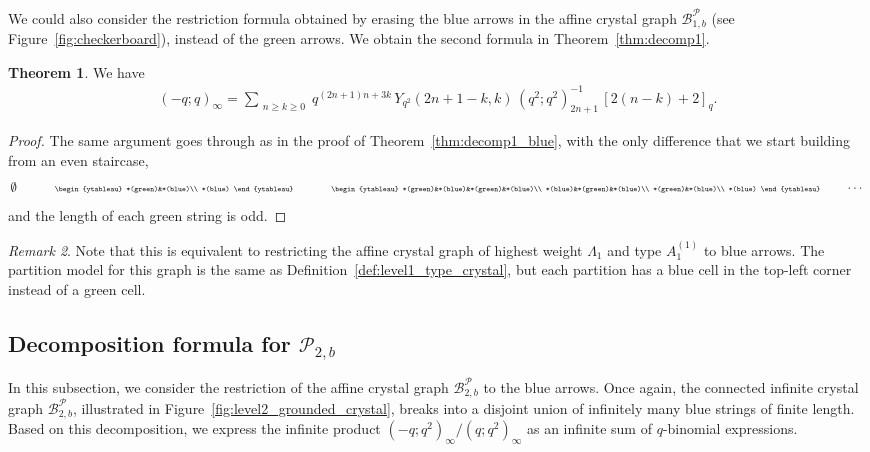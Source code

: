 \documentclass[11pt]{article}
\theoremstyle{definition}
\newtheorem{theorem}{Theorem}[section]
\theoremstyle{remark}
\newtheorem{remark}[theorem]{Remark}
\theoremstyle{definition}
\numberwithin{equation}{section}
\begin{document}
We could also consider the restriction formula obtained by erasing the
blue arrows in the affine crystal graph $\mathcal{B}_{1,b}^{\mathcal{P}}$
(see Figure~\ref{fig:checkerboard}), instead of the green
arrows. We obtain the second formula in Theorem~\ref{thm:decomp1}.
\begin{theorem}\label{thm:decomp1_green}
We have
\begin{align*}
(-q;q)_\infty = \sum_{\substack{n\geq k\geq 0}} q^{(2n+1)n + 3k}\, Y_{q^2}(2n+1-k,k)\,(q^2;q^2)_{2n+1}^{-1}\,[2(n-k)+2]_q.
\end{align*}
\end{theorem}
\begin{proof}
The same argument goes through as in the proof of Theorem~\ref{thm:decomp1_blue}, with the only difference that we start building from an even staircase,
\[
\emptyset
\hspace{3em}
\scalebox{0.6}{\begin{ytableau}
*(green)&*(blue)\\
*(blue)
\end{ytableau}}\hspace{3em}
\scalebox{0.6}{\begin{ytableau}
  *(green)&*(blue)&*(green)&*(blue)\\
  *(blue)&*(green)&*(blue)\\
  *(green)&*(blue)\\
  *(blue)
\end{ytableau}}\hspace{2em}
\cdots\]
and the length of each green string is odd.
\end{proof}

\begin{remark}
Note that this is equivalent to restricting the affine crystal graph of highest weight $\Lambda_1$ and type $A_1^{(1)}$ to blue arrows. The partition model for this graph is the same as Definition~\ref{def:level1_type_crystal}, but each partition has a blue cell in the top-left corner instead of a green cell.
\end{remark}


\subsection{Decomposition formula for $\mathcal{P}_{2,b}$}\label{subsection:decomp2}

In this subsection, we consider the restriction of the affine crystal graph
\(\mathcal{B}_{2,b}^{\mathcal{P}}\) to the blue arrows. Once again,
the connected infinite crystal graph
\(\mathcal{B}_{2,b}^{\mathcal{P}}\), illustrated in
Figure~\ref{fig:level2_grounded_crystal}, breaks into a disjoint union
of infinitely many blue strings of finite length. Based on this
decomposition, we express the infinite product
\((-q;q^2)_\infty / (q;q^2)_\infty\) as an infinite sum of
\(q\)-binomial expressions.
\end{document}
